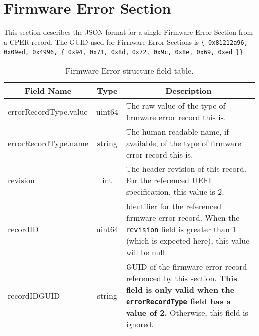 \documentclass{report}
\newcommand*{\thead}[1]{\multicolumn{1}{|c|}{\bfseries #1}}
\newcommand*{\jsontable}[1]{
    \begin{table}[!ht]
    \label{#1}
    \centering
    \begin{adjustbox}{center}
    \begin{tabular}{|l|c|p{8cm}|}
    \hline
    \thead{Field Name} & \thead{Type} & \thead{Description} \\
    \hline
}
\newcommand*{\jsontableend}[1]{
    \hline
    \end{tabular}
    \end{adjustbox}
    \caption{#1}
    \label{table:#1}
    \end{table}
    \FloatBarrier
}
\begin{document}
\section{Firmware Error Section}
\label{section:firmwareerrorsection}
This section describes the JSON format for a single Firmware Error Section from a CPER record. The GUID used for Firmware Error Sections is \texttt{\{ 0x81212a96, 0x09ed, 0x4996, \{ 0x94, 0x71, 0x8d, 0x72, 0x9c, 0x8e, 0x69, 0xed \}\}}.
\jsontable{table:firmwareerrorsection}
errorRecordType.value & uint64 & The raw value of the type of firmware error record this is.\\
errorRecordType.name & string & The human readable name, if available, of the type of firmware error record this is.\\
\hline
revision & int & The header revision of this record. For the referenced UEFI specification, this value is 2.\\
\hline
recordID & uint64 & Identifier for the referenced firmware error record. When the \texttt{revision} field is greater than 1 (which is expected here), this value will be null.\\
\hline
recordIDGUID & string & GUID of the firmware error record referenced by this section. \textbf{This field is only valid when the \texttt{errorRecordType} field has a value of 2.} Otherwise, this field is ignored.\\
\jsontableend{Firmware Error structure field table.}

\end{document}
